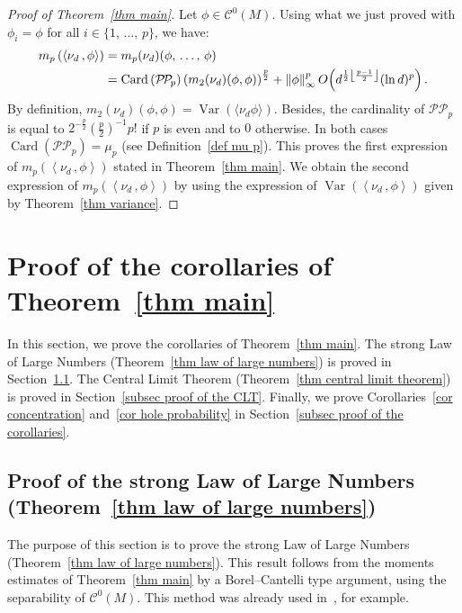 \documentclass[10pt]{amsart}
\theoremstyle{definition}\newtheorem{defi}[theo]{Definition}\newtheorem{rema}[theo]{Remark}\newtheorem{exam}[theo]{Example}\newtheorem{exem}[theo]{Example}\newtheorem{nota}[theo]{Notation}
\DeclareMathOperator{\card}{Card}
\DeclareMathOperator{\Var}{Var}
\DeclarePairedDelimiter{\floor}{\lfloor}{\rfloor}
\newcommand{\clC}{\mathcal{C}}
\newcommand{\pp}{\mathcal{P\!P}\!}
\newcommand{\Norm}[1]{\left\lVert #1 \right\rVert}
\newcommand{\prsc}[2]{\left\langle #1\,, #2 \right\rangle}
\newcommand{\var}[1]{\Var\!\left(#1 \right)}
\begin{document}
\begin{proof}[{Proof of Theorem~\ref{thm main}}]
Let $\phi \in \clC^0(M)$. Using what we just proved with $\phi_i=\phi$ for all $i \in \{1,\,\dots,\,p\}$, we have:
\begin{align*}
m_p\left(\prsc{\nu_d}{\phi}\right) &= m_p(\nu_d)(\phi,\,\dots,\,\phi)\\
&= \card\left(\pp_p\right) \left(m_2(\nu_d)(\phi,\phi)\right)^\frac{p}{2} + \Norm{\phi}_\infty^p O\!\left(d^{\frac{1}{2}\floor*{\frac{p-1}{2}}}(\ln d)^p\right).
\end{align*}
By definition, $m_2(\nu_d)(\phi,\phi)=\Var(\langle\nu_d{\phi}\rangle)$. Besides, the cardinality of $\pp_p$ is equal to $2^{-\frac{p}{2}}(\tfrac{p}{2})^{-1}p!$ if $p$ is even and to $0$ otherwise. In both cases $\card(\pp_p)=\mu_p$ (see Definition~\ref{def mu p}). This proves the first expression of $m_p(\prsc{\nu_d}{\phi})$ stated in Theorem~\ref{thm main}. We obtain the second expression of $m_p(\prsc{\nu_d}{\phi})$ by using the expression of $\var{\prsc{\nu_d}{\phi}}$ given by Theorem~\ref{thm variance}.
\end{proof}



\section{Proof of the corollaries of Theorem~\ref{thm main}}\label{sec proof of the corollaries}

In this section, we prove the corollaries of Theorem~\ref{thm main}. The strong Law of Large Numbers (Theorem~\ref{thm law of large numbers}) is proved in Section~\ref{subsec proof of the LLN}. The Central Limit Theorem (Theorem~\ref{thm central limit theorem}) is proved in Section~\ref{subsec proof of the CLT}. Finally, we prove Corollaries~\ref{cor concentration} and~\ref{cor hole probability} in Section~\ref{subsec proof of the corollaries}.



\subsection{Proof of the strong Law of Large Numbers (Theorem~\ref{thm law of large numbers})}\label{subsec proof of the LLN}

The purpose of this section is to prove the strong Law of Large Numbers (Theorem~\ref{thm law of large numbers}). This result follows from the moments estimates of Theorem~\ref{thm main} by a Borel--Cantelli type argument, using the separability of $\clC^0(M)$. This method was already used in~\cite{Let2019,LP2019,SZ1999}, for example.
\end{document}
